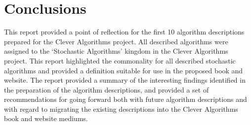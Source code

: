 \documentclass[a4paper, 11pt]{article}
\begin{document}
% 
% 
\section{Conclusions}
\label{sec:conclusions}
This report provided a point of reflection for the first 10 algorithm descriptions prepared for the Clever Algorithms project. All described algorithms were assigned to the `Stochastic Algorithms' kingdom in the Clever Algorithms project. This report highlighted the commonality for all described stochastic algorithms and provided a definition suitable for use in the proposed book and website.
The report provided a summary of the interesting findings identified in the preparation of the algorithm descriptions, and provided a set of recommendations for going forward both with future algorithm descriptions and with regard to migrating the existing descriptions into the Clever Algorithms book and website mediums.



\end{document}
